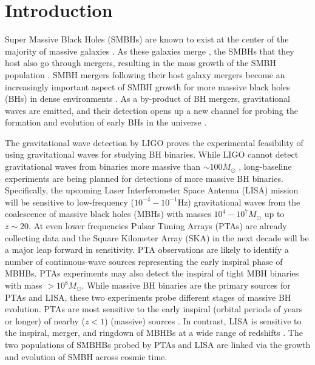 \section{Introduction}
\label{sec:introduction}
Super Massive Black Holes (SMBHs) are known to exist at the center of the majority of massive galaxies \citep[e.g.][]{Soltan1982,Kormendy1995,Magorrian1998,Kormendy2013}. 
As these galaxies merge \citep[e.g.][]{Lacey1993,Lotz2011,Rodriguez-Gomez2015}, the SMBHs that they host also go through mergers, resulting in the mass growth of the SMBH population \citep[e.g.][]{Begelman1980}.
SMBH mergers following their host galaxy mergers become an increasingly important aspect of SMBH growth for more massive black holes (BHs) in dense environments \citep[e.g.][]{Kulier2015}. 
As a by-product of BH mergers, gravitational waves are emitted, and their detection opens up a new channel for probing the formation and evolution of early BHs in the universe \citep[e.g.][]{Sesana2007a,Barausse2012}. 


The gravitational wave detection by LIGO \citep[][]{LIGO2016PhRvL.116f1102A} proves the experimental feasibility of using gravitational waves for studying BH binaries. 
While LIGO cannot detect gravitational waves from binaries more massive than $\sim 100 M_\odot$ \citep[][]{Mangiagli2019}, long-baseline experiments are being planned for detections of more massive BH binaries. 
Specifically, the upcoming Laser Interferometer Space Antenna (LISA) \citep{LISA2017arXiv170200786A} mission will be sensitive to low-frequency ($10^{-4}-10^{-1}$Hz) gravitational waves from the coalescence of massive black holes (MBHs) with masses $10^4-10^7 M_\odot$ up to $z\sim 20$. 
 At even lower
frequencies Pulsar Timing Arrays (PTAs) are already collecting data and the
Square Kilometer Array (SKA) in the next decade will be a major leap forward in
sensitivity. PTA observations are likely to identify a number of
continuous-wave sources representing the early inspiral phase of MBHBs.
PTAs experiments \citep[e.g.][]{Jenet2004,Jenet2005} may also detect the inspiral of tight MBH binaries with mass $>10^8 M_\odot$. 
While massive BH binaries are the primary sources for PTAs and LISA, these
two experiments probe different stages of massive BH evolution. PTAs are most sensitive to the early inspiral
(orbital periods of years or longer) of nearby ($z <1$) (massive) sources  \citep{Mingarelli2017}. 
In contrast, LISA is sensitive to the inspiral, merger, and ringdown of
MBHBs  at a wide range of redshifts \citep{Amaro-Seoane2012}. 
The two populations of SMBHBs probed by PTAs and LISA are linked
via the growth and evolution of SMBH across cosmic time. 


